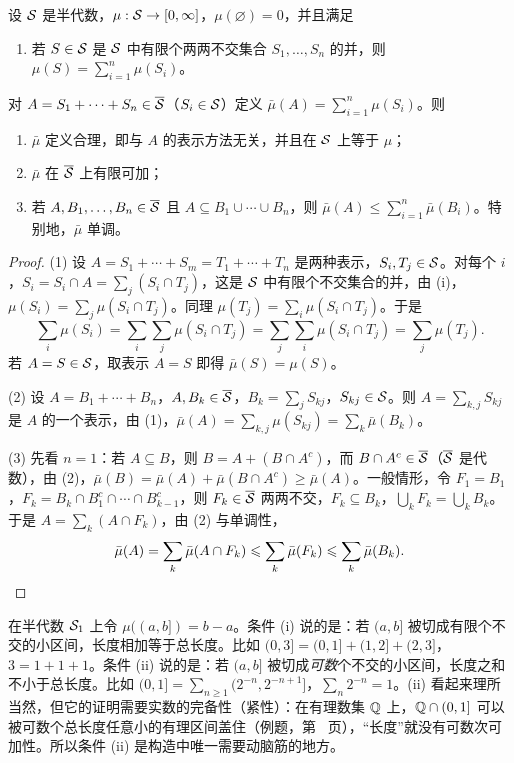 \begin{lemma}\label{lem:extension:finite-additive}
设 $\mathcal{S}$ 是半代数，$\mu:\mathcal{S}\to[0,\infty]$，$\mu(\varnothing)=0$，并且满足
\begin{enumerate}
\item[(i)] 若 $S\in\mathcal{S}$ 是 $\mathcal{S}$ 中有限个两两不交集合 $S_1,\dots,S_n$ 的并，则 $\mu(S)=\sum_{i=1}^n\mu(S_i)$。
\end{enumerate}
对 $A=S_1+\cdots+S_n\in\overline{\mathcal{S}}$（$S_i\in\mathcal{S}$）定义 $\bar\mu(A)=\sum_{i=1}^n\mu(S_i)$。则
\begin{enumerate}
\item $\bar\mu$ 定义合理，即与 $A$ 的表示方法无关，并且在 $\mathcal{S}$ 上等于 $\mu$；
\item $\bar\mu$ 在 $\overline{\mathcal{S}}$ 上有限可加；
\item 若 $A,B_1,\dots,B_n\in\overline{\mathcal{S}}$ 且 $A\subseteq B_1\cup\cdots\cup B_n$，则 $\bar\mu(A)\leqslant\sum_{i=1}^n\bar\mu(B_i)$。特别地，$\bar\mu$ 单调。
\end{enumerate}
\end{lemma}
\begin{proof}
(1) 设 $A=S_1+\cdots+S_m=T_1+\cdots+T_n$ 是两种表示，$S_i,T_j\in\mathcal{S}$。对每个 $i$，$S_i=S_i\cap A=\sum_j(S_i\cap T_j)$，这是 $\mathcal{S}$ 中有限个不交集合的并，由 (i)，$\mu(S_i)=\sum_j\mu(S_i\cap T_j)$。同理 $\mu(T_j)=\sum_i\mu(S_i\cap T_j)$。于是
\[
\sum_i\mu(S_i)=\sum_i\sum_j\mu(S_i\cap T_j)=\sum_j\sum_i\mu(S_i\cap T_j)=\sum_j\mu(T_j).
\]
若 $A=S\in\mathcal{S}$，取表示 $A=S$ 即得 $\bar\mu(S)=\mu(S)$。

(2) 设 $A=B_1+\cdots+B_n$，$A,B_k\in\overline{\mathcal{S}}$，$B_k=\sum_jS_{kj}$，$S_{kj}\in\mathcal{S}$。则 $A=\sum_{k,j}S_{kj}$ 是 $A$ 的一个表示，由 (1)，$\bar\mu(A)=\sum_{k,j}\mu(S_{kj})=\sum_k\bar\mu(B_k)$。

(3) 先看 $n=1$：若 $A\subseteq B$，则 $B=A+(B\cap A^c)$，而 $B\cap A^c\in\overline{\mathcal{S}}$（$\overline{\mathcal{S}}$ 是代数），由 (2)，$\bar\mu(B)=\bar\mu(A)+\bar\mu(B\cap A^c)\geqslant\bar\mu(A)$。一般情形，令 $F_1=B_1$，$F_k=B_k\cap B_1^c\cap\cdots\cap B_{k-1}^c$，则 $F_k\in\overline{\mathcal{S}}$ 两两不交，$F_k\subseteq B_k$，$\bigcup_kF_k=\bigcup_kB_k$。于是 $A=\sum_k(A\cap F_k)$，由 (2) 与单调性，
\[
\bar\mu(A)=\sum_k\bar\mu(A\cap F_k)\leqslant\sum_k\bar\mu(F_k)\leqslant\sum_k\bar\mu(B_k).\qedhere
\]
\end{proof}

\begin{example}[半代数上的集函数]
在半代数 $\mathcal{S}_1$ 上令 $\mu((a,b])=b-a$。条件 (i) 说的是：若 $(a,b]$ 被切成有限个不交的小区间，长度相加等于总长度。比如 $(0,3]=(0,1]+(1,2]+(2,3]$，$3=1+1+1$。条件 (ii) 说的是：若 $(a,b]$ 被切成\emph{可数}个不交的小区间，长度之和不小于总长度。比如 $(0,1]=\sum_{n\geqslant1}(2^{-n},2^{-n+1}]$，$\sum_n2^{-n}=1$。(ii) 看起来理所当然，但它的证明需要实数的完备性（紧性）：在有理数集 $\mathbb{Q}$ 上，$\mathbb{Q}\cap(0,1]$ 可以被可数个总长度任意小的有理区间盖住（例题，第~\pageref{we:measures:rationals} 页），“长度”就没有可数次可加性。所以条件 (ii) 是构造中唯一需要动脑筋的地方。
\end{example}

